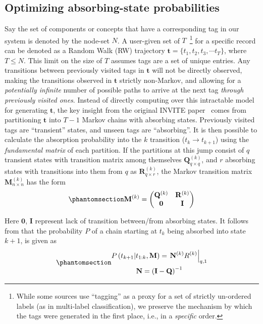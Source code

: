 \documentclass[%
	12pt,
		oneside,
		letterpaper
]{book}
\begin{document}
\subsection{Optimizing absorbing-state
probabilities}\label{optimizing-absorbing-state-probabilities}

Say the set of components or concepts that have a corresponding tag in
our system is denoted by the node-set \(N\). A user-given set of
\(T\)~\footnote{While some sources use ``tagging'' as a proxy for a set
  of strictly un-ordered labels (as in multi-label classification), we
  preserve the mechanism by which the tags were generated in the first
  place, i.e., in a \emph{specific} order.} for a specific record can be
denoted as a Random Walk (RW) trajectory
\(\mathbf{t}=\{t_1, t_2, t_3, \cdots t_{T}\}\), where \(T\leq N\). This
limit on the size of \(T\) assumes tags are a set of unique entries. Any
transitions between previously visited tags in \(\mathbf{t}\) will not
be directly observed, making the transitions observed in \(\mathbf{t}\)
strictly non-Markov, and allowing for a \emph{potentially infinite}
number of possible paths to arrive at the next tag \emph{through
previously visited ones}. Instead of directly computing over this
intractable model for generating \(\mathbf{t}\), the key insight from
the original INVITE paper~\autocite{Humanmemorysearch_Jun2015} comes
from partitioning \(\mathbf{t}\) into \(T-1\) Markov chains with
absorbing states. Previously visited tags are ``transient'' states, and
unseen tags are ``absorbing''. It is then possible to calculate the
absorption probability into the \(k\) transition
(\(t_k \rightarrow t_{k+1}\)) using the \emph{fundamental matrix} of
each partition. If the partitions at this jump consist of \(q\)
transient states with transition matrix among themselves
\(\mathbf{Q}^{(k)}_{q\times q}\), and \(r\) absorbing states with
transitions into them from \(q\) as \(\mathbf{R}^{(k)}_{q\times r}\),
the Markov transition matrix \(\mathbf{M}^{(k)}_{n\times n}\) has the
form \begin{equation}\phantomsection\label{eq-trans-matrix}{
\mathbf{M}^{(k)} =
    \begin{pmatrix}
        \mathbf{Q}^{(k)}  & \mathbf{R}^{(k)} \\
        \mathbf{0}        & \mathbf{I}
    \end{pmatrix}
}\end{equation}

Here \(\mathbf{0}\), \(\mathbf{I}\) represent lack of transition
between/from absorbing states. It follows from
\autocite{RandomWalksElectric_Doyle2000} that the probability \(P\) of a
chain starting at \(t_k\) being absorbed into state \(k+1\), is given as
\begin{equation}\phantomsection\label{eq-absorb}{
\begin{gathered}
    P\left(t_{k+1} \middle| t_{1:k},\mathbf{M}\right) =
        \left.\mathbf{N}^{(k)}R^{(k)}\right|_{q,1}\\
\mathbf{N} = \left( \mathbf{I}-\mathbf{Q} \right) ^{-1}
\end{gathered}
}\end{equation}
\end{document}
